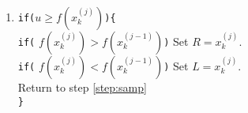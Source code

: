 \documentclass{article}
\begin{document}
\begin{enumerate}
\begin{enumerate}[label=\alph*.,leftmargin=1.75\parindent]
\begin{enumerate}
      \item {\tt if(}$u \ge f(x^{(j)}_k)${\tt)\{} \\
       {\tt if(} $f(x^{(j)}_k) > f(x^{(j-1)}_k)${\tt)} Set $R = x^{(j)}_k$. \\
       {\tt if(} $f(x^{(j)}_k) < f(x^{(j-1)}_k)${\tt)} Set $L = x^{(j)}_k$. \\
       Return to step \ref{step:samp} \\
       {\tt \}}
      \end{enumerate}  

\end{enumerate}
\end{enumerate}
\end{document}
